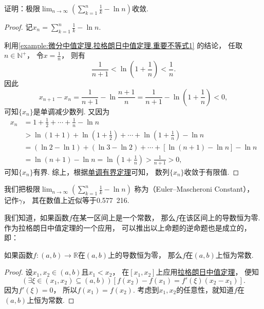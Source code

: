 \begin{example}\label{example:微分中值定理.拉格朗日中值定理.欧拉--马歇罗尼常数}
证明：极限\(\lim_{n\to\infty} \left(\sum_{k=1}^n \frac{1}{k} - \ln n\right)\)收敛.
\begin{proof}
记\(x_n = \sum_{k=1}^n \frac{1}{k} - \ln n\).

利用\cref{example:微分中值定理.拉格朗日中值定理.重要不等式1} 的结论，
任取\(n\in\mathbb{N}^+\)，
令\(x=\frac{1}{n}\)，
则有\[
	\frac{1}{n+1} < \ln(1+\frac{1}{n}) < \frac{1}{n}.
\]
因此\[
	x_{n+1} - x_n = \frac{1}{n+1} - \ln\frac{n+1}{n}
	= \frac{1}{n+1} - \ln(1+\frac{1}{n}) < 0,
\]
可知\(\{x_n\}\)是单调减少数列.
又因为\begin{align*}
	x_n &= 1 + \frac{1}{2} + \dotsb + \frac{1}{n} - \ln n \\
	&> \ln(1+1) + \ln(1+\frac{1}{2}) + \dotsb + \ln(1+\frac{1}{n}) - \ln n \\
	&= (\ln2-\ln1)+(\ln3-\ln2)+\dotsb+[\ln(n+1)-\ln n] - \ln n \\
	&= \ln(n+1) - \ln n
	= \ln(1+\frac{1}{n})
	> \frac{1}{n+1} > 0,
\end{align*}
可知\(\{x_n\}\)有界.
综上，根据\hyperref[theorem:极限.函数的单调有界定理]{单调有界定理}可知，
数列\(\{x_n\}\)收敛于有限值.
\end{proof}
\end{example}
\begin{remark}
我们把极限\(\lim_{n\to\infty} \left(\sum_{k=1}^n \frac{1}{k} - \ln n\right)\)
称为（Euler--Mascheroni Constant），
记作\(\gamma\)，
其在数值上近似等于{0.577~216}.
\end{remark}

我们知道，如果函数\(f\)在某一区间上是一个常数，
那么\(f\)在该区间上的导数恒为零.作为拉格朗日中值定理的一个应用，
可以推出以上命题的逆命题也是成立的，即：
\begin{theorem}
如果函数\(f\colon(a,b)\to\mathbb{R}\)在\((a,b)\)上的导数恒为零，
那么\(f\)在\((a,b)\)上恒为常数.
\begin{proof}
设\(x_1,x_2\in(a,b)\)且\(x_1<x_2\)，
在\([x_1,x_2]\)上应用\hyperref[theorem:微分中值定理.拉格朗日中值定理]{拉格朗日中值定理}，
便知\[
	(\exists\xi\in(x_1,x_2)\subseteq(a,b))
	[f(x_2) - f(x_1) = f'(\xi) (x_2 - x_1)].
\]
因为\(f'(\xi) = 0\)，
所以\(f(x_1) = f(x_2)\).
考虑到\(x_1,x_2\)的任意性，就知道\(f\)在\((a,b)\)上恒为常数.
\end{proof}
\end{theorem}

